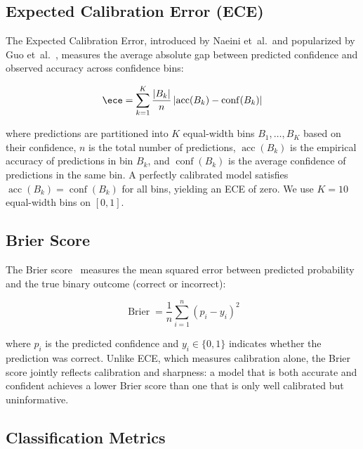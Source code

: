 \subsection{Expected Calibration Error (ECE)}
\label{subsec:met-ece}

The Expected Calibration Error, introduced by Naeini et~al.\ and 
popularized by Guo et~al.~\cite{guo2017calibration}, measures the average 
absolute gap between predicted confidence and observed accuracy across 
confidence bins:

\begin{equation}
    \ece = \sum_{k=1}^{K} \frac{|B_k|}{n}
    \left| \operatorname{acc}(B_k) - \operatorname{conf}(B_k) \right|
    \label{eq:ece}
\end{equation}

where predictions are partitioned into $K$ equal-width bins $B_1, \ldots, 
B_K$ based on their confidence, $n$ is the total number of predictions, 
$\operatorname{acc}(B_k)$ is the empirical accuracy of predictions in 
bin $B_k$, and $\operatorname{conf}(B_k)$ is the average confidence of 
predictions in the same bin. A perfectly calibrated model satisfies 
$\operatorname{acc}(B_k) = \operatorname{conf}(B_k)$ for all bins, yielding 
an ECE of zero. We use $K = 10$ equal-width bins on $[0, 1]$.

\subsection{Brier Score}
\label{subsec:met-brier}

The Brier score~\cite{brier1950} measures the mean squared error between 
predicted probability and the true binary outcome (correct or incorrect):

\begin{equation}
    \operatorname{Brier} = \frac{1}{n} \sum_{i=1}^{n}
    \left( p_i - y_i \right)^2
    \label{eq:brier}
\end{equation}

where $p_i$ is the predicted confidence and $y_i \in \{0, 1\}$ indicates 
whether the prediction was correct. Unlike ECE, which measures calibration 
alone, the Brier score jointly reflects calibration and sharpness: a model 
that is both accurate and confident achieves a lower Brier score than one 
that is only well calibrated but uninformative.

\subsection{Classification Metrics}
\label{subsec:met-classification}

